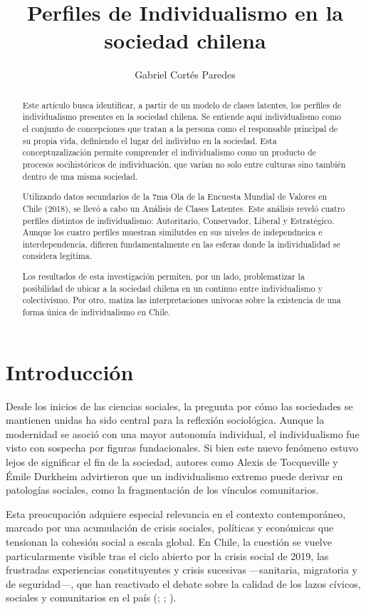 \documentclass[
  letterpaper,
  DIV=11,
  numbers=noendperiod]{scrartcl}
\title{Perfiles de Individualismo en la sociedad chilena}
\author{Gabriel Cortés Paredes}
\date{}
\begin{document}
\maketitle
\begin{abstract}
Este artículo busca identificar, a partir de un modelo de clases
latentes, los perfiles de individualismo presentes en la sociedad
chilena. Se entiende aquí individualismo como el conjunto de
concepciones que tratan a la persona como el responsable principal de su
propia vida, definiendo el lugar del individuo en la sociedad. Esta
conceptuzalización permite comprender el individualismo como un producto
de procesos socihistóricos de individuación, que varían no solo entre
culturas sino también dentro de una misma sociedad.

Utilizando datos secundarios de la 7ma Ola de la Encuesta Mundial de
Valores en Chile (2018), se llevó a cabo un Análisis de Clases Latentes.
Este análisis reveló cuatro perfiles distintos de individualismo:
Autoritario, Conservador, Liberal y Estratégico. Aunque los cuatro
perfiles muestran similutdes en sus niveles de independneica e
interdependencia, difieren fundamentalmente en las esferas donde la
individualidad se considera legítima.

Los resultados de esta investigación permiten, por un lado,
problematizar la posibilidad de ubicar a la sociedad chilena en un
continuo entre individualismo y colectivismo. Por otro, matiza las
interpretaciones unívocas sobre la existencia de una forma única de
individualismo en Chile.
\end{abstract}


\section{Introducción}\label{introducciuxf3n}

Desde los inicios de las ciencias sociales, la pregunta por cómo las
sociedades se mantienen unidas ha sido central para la reflexión
sociológica. Aunque la modernidad se asoció con una mayor autonomía
individual, el individualismo fue visto con sospecha por figuras
fundacionales. Si bien este nuevo fenómeno estuvo lejos de significar el
fin de la sociedad, autores como Alexis de Tocqueville y Émile Durkheim
advirtieron que un individualismo extremo puede derivar en patologías
sociales, como la fragmentación de los vínculos comunitarios.

Esta preocupación adquiere especial relevancia en el contexto
contemporáneo, marcado por una acumulación de crisis sociales, políticas
y económicas que tensionan la cohesión social a escala global. En Chile,
la cuestión se vuelve particularmente visible tras el ciclo abierto por
la crisis social de 2019, las frustradas experiencias constituyentes y
crisis sucesivas ---sanitaria, migratoria y de seguridad---, que han
reactivado el debate sobre la calidad de los lazos cívicos, sociales y
comunitarios en el país (;
; ).
\end{document}
